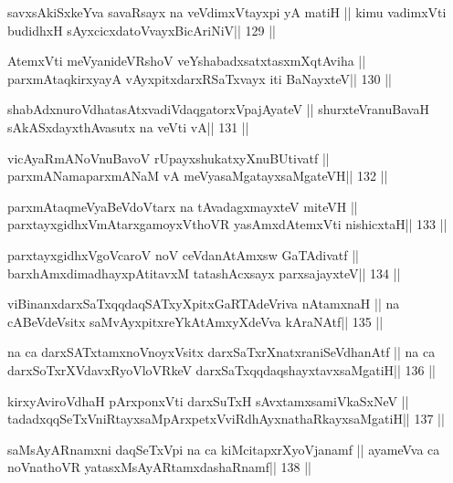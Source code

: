 \begin{shl}
savxsAkiSxkeYva savaRsayx na veVdimxVtayxpi yA matiH ||
kimu vadimxVti budidhxH sAyxcicxdatoV\s vayxBicAriNiV\hfill || 129 ||
\end{shl}

\begin{shl}
AtemxVti meVyanideVRshoV veYshabadxsatxtasxmXqtAviha ||
parxmAtaqkirxyayA vAyxpitxdarxRSaTxvayx iti BaNayxteV\hfill || 130 ||
\end{shl}

\begin{shl}
shabAdxnuroVdhatasAtxvadiVdaqgatorxVpajAyateV ||
shurxteVranuBavaH sAkASxdayxthAvasutx na veVti vA\hfill || 131 ||
\end{shl}

\begin{shl}
vicAyaRmANoV\s nuBavoV rUpayxshukatxyXnuBUtivatf ||
parxmANamaparxmANaM vA meVyasaMgatayxsaMgateVH\hfill || 132 ||
\end{shl}

\begin{shl}
parxmAtaqmeVyaBeVdoV\s tarx na tAvadagxmayxteV miteVH ||
parxtayxgidhxVmAtarxgamoyxV\s thoVR yasAmxdAtemxVti nishicxtaH\hfill || 133 ||
\end{shl}

\begin{shl}
parxtayxgidhxVgoVcaroV noV ceVdanAtAmx\s sw GaTAdivatf ||
barxhAmxdimadhayxpAtitavxM tatashAcxsayx parxsajayxteV\hfill || 134 ||
\end{shl}

\begin{shl}
viBinanxdarxSaTxqqdaqSATxyXpitxGaRTAdeVriva nA\s\s tamxnaH ||
na cABeVdeV\s sitx saMvAyxpitxreYkAtAmxyXdeVva kAraNAtf\hfill || 135 ||
\end{shl}

\begin{shl}
na ca darxSATx\s\s tamxnoV\s noyxV\s sitx darxSaTxrXnatxraniSeVdhanAtf ||
na ca darxSoTxrXVdavxRyoVloVRkeV darxSaTxqqdaqshayxtavxsaMgatiH\hfill || 136 ||
\end{shl}

\begin{shl}
kirxyAviroVdhaH pArxponxVti darxSuTxH sAvxtamxsamiVkaSxNeV ||
tadadxqqSeTxVniRtayxsaMpArxpetxVviRdhAyxnathaRkayxsaMgatiH\hfill || 137 ||
\end{shl}

\begin{shl}
saMsAyARnamxni daqSeTxV\s pi na ca kiMcitapxrXyoVjanamf ||
ayameVva ca noV\s nathoVR yatasxMsAyARtamxdashaRnamf\hfill || 138 ||
\end{shl}

